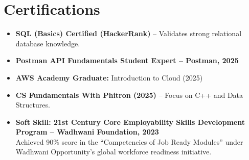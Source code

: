\documentclass[10pt,letterpaper]{article}
\newenvironment{highlights}{
  \begin{itemize}[topsep=2pt,parsep=1pt,partopsep=0pt,itemsep=0pt,leftmargin=10pt]
}{\end{itemize}}
\begin{document}
\section{Certifications}
\begin{highlights}
  \item \textbf{SQL (Basics) Certified (HackerRank)} -- Validates strong relational database knowledge.
  \href{https://www.hackerrank.com/certificates/539f8885f96a}{\textcolor{myblue}{\faExternalLink*}}
  \item \textbf{Postman API Fundamentals Student Expert -- Postman, 2025}
  \href{https://badges.parchment.com/public/assertions/fN9nswpfR1WrnmD2XuL_bQ}{\textcolor{myblue}{\faExternalLink*}}
  \item \textbf{AWS Academy Graduate:} Introduction to Cloud (2025)
  \href{https://www.credly.com/badges/a7885fd8-c50d-4134-ba82-bb392fe1f139}{\textcolor{myblue}{\faExternalLink*}}
  \item \textbf{CS Fundamentals With Phitron (2025)} -- Focus on C++ and Data Structures.
  \href{https://phitron.io/course-details/batch3}{\textcolor{myblue}{\faExternalLink*}}
  \item \textbf{Soft Skill: 21st Century Core Employability Skills Development Program -- Wadhwani Foundation, 2023}
  \href{https://web.certificate.wfglobal.org/en/certificate?certificateId=657185118c30de8667bdadc4}{\textcolor{myblue}{\faExternalLink*}}\\
  Achieved 90\% score in the ``Competencies of Job Ready Modules'' under Wadhwani Opportunity's global workforce readiness initiative.
\end{highlights}
\end{document}
